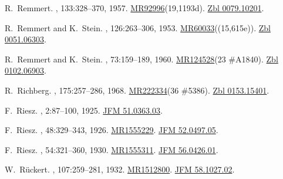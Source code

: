 \documentclass[11pt,a4paper, final, twoside]{article}
\numberwithin{equation}{section}
\begin{document}
\begin{appendices}
\begin{thebibliography}{100}
R.~Remmert.
, 133:328--370, 1957.
\newblock
  \href{http://www.ams.org/mathscinet-getitem?mr=92996}{MR92996}(19,1193d).
  \href{http://zbmath.org/?q=an:0079.10201}{Zbl 0079.10201}.

R.~Remmert and K.~Stein.
, 126:263--306, 1953.
\newblock
  \href{http://www.ams.org/mathscinet-getitem?mr=60033}{MR60033}((15,615e)).
  \href{http://zbmath.org/?q=an:0051.06303}{Zbl 0051.06303}.

R.~Remmert and K.~Stein.
, 73:159--189, 1960.
\newblock \href{http://www.ams.org/mathscinet-getitem?mr=124528}{MR124528}(23
  \#A1840). \href{http://zbmath.org/?q=an:0102.06903}{Zbl 0102.06903}.

R.~Richberg.
, 175:257--286, 1968.
\newblock \href{http://www.ams.org/mathscinet-getitem?mr=222334}{MR222334}(36
  \#5386). \href{http://zbmath.org/?q=an:0153.15401}{Zbl 0153.15401}.

F.~Riesz.
, 2:87--100, 1925.
\newblock \href{http://zbmath.org/?q=an:51.0363.03}{JFM 51.0363.03}.

F.~Riesz.
, 48:329--343, 1926.
\newblock \href{http://www.ams.org/mathscinet-getitem?mr=1555229}{MR1555229}.
  \href{http://zbmath.org/?q=an:52.0497.05}{JFM 52.0497.05}.

F.~Riesz.
, 54:321--360, 1930.
\newblock \href{http://www.ams.org/mathscinet-getitem?mr=1555311}{MR1555311}.
  \href{http://zbmath.org/?q=an:56.0426.01}{JFM 56.0426.01}.

W.~R\"uckert.
, 107:259--281, 1932.
\newblock \href{http://www.ams.org/mathscinet-getitem?mr=1512800}{MR1512800}.
  \href{http://zbmath.org/?q=an:58.1027.02}{JFM 58.1027.02}.


\end{thebibliography}
\end{appendices}
\end{document}
